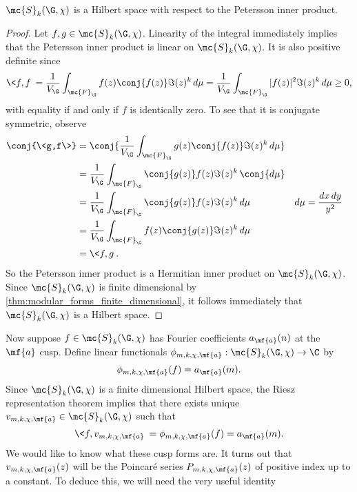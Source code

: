    \begin{proposition}\label{prop:Petersson_inner_product_hermitian_holomorphic}
      $\mc{S}_{k}(\G,\chi)$ is a Hilbert space with respect to the Petersson inner product.
    \end{proposition}
    \begin{proof}
      Let $f,g \in \mc{S}_{k}(\G,\chi)$. Linearity of the integral immediately implies that the Petersson inner product is linear on $\mc{S}_{k}(\G,\chi)$. It is also positive definite since
      \[
        \<f,f\> = \frac{1}{V_{\G}}\int_{\mc{F}_{\G}}f(z)\conj{f(z)}\Im(z)^{k}\,d\mu = \frac{1}{V_{\G}}\int_{\mc{F}_{\G}}|f(z)|^{2}\Im(z)^{k}\,d\mu \ge 0,
      \]
      with equality if and only if $f$ is identically zero. To see that it is conjugate symmetric, observe
      \begin{align*}
        \conj{\<g,f\>} &= \conj{\frac{1}{V_{\G}}\int_{\mc{F}_{\G}}g(z)\conj{f(z)}\Im(z)^{k}\,d\mu} \\
        &= \frac{1}{V_{\G}}\int_{\mc{F}_{\G}}\conj{g(z)}f(z)\Im(z)^{k}\,\conj{d\mu} \\
        &= \frac{1}{V_{\G}}\int_{\mc{F}_{\G}}\conj{g(z)}f(z)\Im(z)^{k}\,d\mu && \text{$d\mu = \frac{dx\,dy}{y^{2}}$} \\
        &= \frac{1}{V_{\G}}\int_{\mc{F}_{\G}}f(z)\conj{g(z)}\Im(z)^{k}\,d\mu \\
        &= \<f,g\>.
      \end{align*}
      So the Petersson inner product is a Hermitian inner product on $\mc{S}_{k}(\G,\chi)$. Since $\mc{S}_{k}(\G,\chi)$ is finite dimensional by \cref{thm:modular_forms_finite_dimensional}, it follows immediately that $\mc{S}_{k}(\G,\chi)$ is a Hilbert space.
    \end{proof}

    Now suppose $f \in \mc{S}_{k}(\G,\chi)$ has Fourier coefficients $a_{\mf{a}}(n)$ at the $\mf{a}$ cusp. Define linear functionals $\phi_{m,k,\chi,\mf{a}}:\mc{S}_{k}(\G,\chi) \to \C$ by 
    \[
      \phi_{m,k,\chi,\mf{a}}(f) = a_{\mf{a}}(m).
    \]
    Since $\mc{S}_{k}(\G,\chi)$ is a finite dimensional Hilbert space, the Riesz representation theorem implies that there exists unique $v_{m,k,\chi,\mf{a}} \in \mc{S}_{k}(\G,\chi)$ such that
    \[
      \<f,v_{m,k,\chi,\mf{a}}\> = \phi_{m,k,\chi,\mf{a}}(f) = a_{\mf{a}}(m).
    \]
    We would like to know what these cusp forms are. It turns out that $v_{m,k,\chi,\mf{a}}(z)$ will be the Poincar\'e series $P_{m,k,\chi,\mf{a}}(z)$ of positive index up to a constant. To deduce this, we will need the very useful identity

